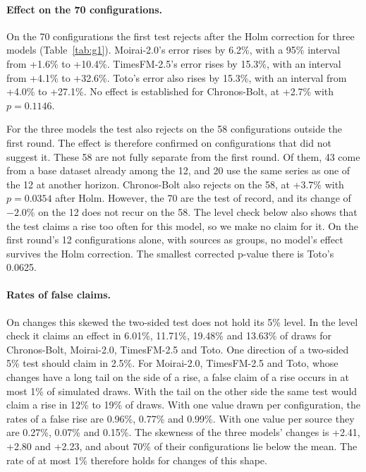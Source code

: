 \documentclass{article}
\begin{document}
\paragraph{Effect on the 70 configurations.} On the 70 configurations the first test rejects
after the Holm correction for three models (Table~\ref{tab:g1}). Moirai-2.0's error rises by
6.2\%, with a 95\% interval from +1.6\% to +10.4\%. TimesFM-2.5's error rises by 15.3\%, with
an interval from +4.1\% to +32.6\%. Toto's error also rises by 15.3\%, with an interval from
+4.0\% to +27.1\%. No effect is established for Chronos-Bolt, at +2.7\% with $p = 0.1146$.

For the three models the test also rejects on the 58 configurations outside the first round.
The effect is therefore confirmed on configurations that did not suggest it. These 58 are not
fully separate from the first round. Of them, 43 come from a base dataset already among the 12,
and 20 use the same series as one of the 12 at another horizon. Chronos-Bolt also rejects on
the 58, at +3.7\% with $p = 0.0354$ after Holm. However, the 70 are the test of record, and
its change of $-2.0\%$ on the 12 does not recur on the 58. The level check below also shows
that the test claims a rise too often for this model, so we make no claim for it. On the first
round's 12 configurations alone, with sources as groups, no model's effect survives the Holm
correction. The smallest corrected p-value there is Toto's 0.0625.

\paragraph{Rates of false claims.} On changes this skewed the two-sided test does not hold its
5\% level. In the level check it claims an effect in 6.01\%, 11.71\%, 19.48\% and 13.63\% of
draws for Chronos-Bolt, Moirai-2.0, TimesFM-2.5 and Toto. One direction of a two-sided 5\%
test should claim in 2.5\%. For Moirai-2.0, TimesFM-2.5 and Toto, whose changes have a long
tail on the side of a rise, a false claim of a rise occurs in at most 1\% of simulated draws.
With the tail on the other side the same test would claim a rise in 12\% to 19\% of draws.
With one value drawn per configuration, the rates of a false rise are 0.96\%, 0.77\% and
0.99\%. With one value per source they are 0.27\%, 0.07\% and 0.15\%. The skewness of the
three models' changes is +2.41, +2.80 and +2.23, and about 70\% of their configurations lie
below the mean. The rate of at most 1\% therefore holds for changes of this shape.
\end{document}
